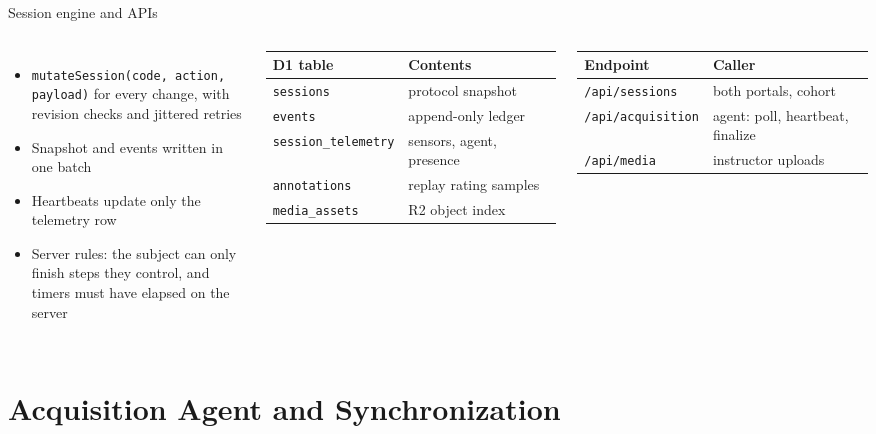 \documentclass[aspectratio=169,11pt]{beamer}
\newcommand{\code}[1]{{\small\texttt{#1}}}
\begin{document}
\begin{frame}{Session engine and APIs}
  \begin{columns}[T]
    \small
    \begin{itemize}
      \item \code{mutateSession(code, action, payload)} for every change, with revision checks and jittered retries
      \item Snapshot and events written in one batch
      \item Heartbeats update only the telemetry row
      \item Server rules: the subject can only finish steps they control, and timers must have elapsed on the server
    \end{itemize}
    \scriptsize
    \begin{tabular}{@{}l l@{}}
      \toprule
      D1 table & Contents \\
      \midrule
      \code{sessions} & protocol snapshot \\
      \code{events} & append-only ledger \\
      \code{session\_telemetry} & sensors, agent, presence \\
      \code{annotations} & replay rating samples \\
      \code{media\_assets} & R2 object index \\
      \bottomrule
    \end{tabular}
    \vspace{0.5em}

    \begin{tabular}{@{}l l@{}}
      \toprule
      Endpoint & Caller \\
      \midrule
      \code{/api/sessions} & both portals, cohort \\
      \code{/api/acquisition} & agent: poll, heartbeat, finalize \\
      \code{/api/media} & instructor uploads \\
      \bottomrule
    \end{tabular}
  \end{columns}
\end{frame}

\section{Acquisition Agent and Synchronization}
\end{document}
